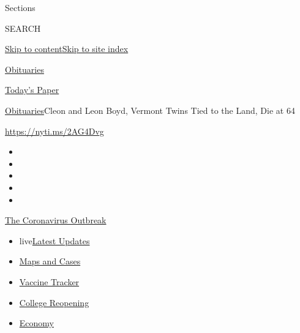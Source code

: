 Sections

SEARCH

\protect\hyperlink{site-content}{Skip to
content}\protect\hyperlink{site-index}{Skip to site index}

\href{https://www.nytimes.com/section/obituaries}{Obituaries}

\href{https://myaccount.nytimes.com/auth/login?response_type=cookie\&client_id=vi}{}

\href{https://www.nytimes.com/section/todayspaper}{Today's Paper}

\href{/section/obituaries}{Obituaries}\textbar{}Cleon and Leon Boyd,
Vermont Twins Tied to the Land, Die at 64

\url{https://nyti.ms/2AG4Dvg}

\begin{itemize}
\item
\item
\item
\item
\item
\end{itemize}

\href{https://www.nytimes.com/news-event/coronavirus?action=click\&pgtype=Article\&state=default\&region=TOP_BANNER\&context=storylines_menu}{The
Coronavirus Outbreak}

\begin{itemize}
\tightlist
\item
  live\href{https://www.nytimes.com/2020/08/03/world/coronavirus-covid-19.html?action=click\&pgtype=Article\&state=default\&region=TOP_BANNER\&context=storylines_menu}{Latest
  Updates}
\item
  \href{https://www.nytimes.com/interactive/2020/us/coronavirus-us-cases.html?action=click\&pgtype=Article\&state=default\&region=TOP_BANNER\&context=storylines_menu}{Maps
  and Cases}
\item
  \href{https://www.nytimes.com/interactive/2020/science/coronavirus-vaccine-tracker.html?action=click\&pgtype=Article\&state=default\&region=TOP_BANNER\&context=storylines_menu}{Vaccine
  Tracker}
\item
  \href{https://www.nytimes.com/2020/08/02/us/covid-college-reopening.html?action=click\&pgtype=Article\&state=default\&region=TOP_BANNER\&context=storylines_menu}{College
  Reopening}
\item
  \href{https://www.nytimes.com/live/2020/08/03/business/stock-market-today-coronavirus?action=click\&pgtype=Article\&state=default\&region=TOP_BANNER\&context=storylines_menu}{Economy}
\end{itemize}

